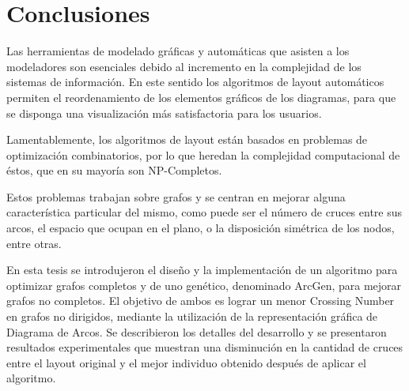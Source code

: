 \label{cap6}
\chapter{Conclusiones}
Las herramientas de modelado gráficas y automáticas que asisten a los modeladores son esenciales debido al incremento en la complejidad de los sistemas de información. En este sentido los algoritmos de layout automáticos permiten el reordenamiento de los elementos gráficos de los diagramas, para que se disponga una visualización más satisfactoria para los usuarios. 

Lamentablemente, los algoritmos de layout están basados en problemas de optimización combinatorios, por lo que heredan la complejidad computacional de éstos, que en su mayoría son NP-Completos.

Estos problemas trabajan sobre grafos y se centran en mejorar alguna característica particular del mismo, como puede ser el número de cruces entre sus arcos, el espacio que ocupan en el plano, o la disposición simétrica de los nodos, entre otras.


En esta tesis se introdujeron el diseño y la implementación de un algoritmo para optimizar grafos completos y de uno genético, denominado {\sc ArcGen}, para mejorar grafos no completos. El objetivo de ambos es lograr un menor Crossing Number en grafos no dirigidos, mediante la utilización de la representación gráfica de Diagrama de Arcos.
Se describieron los detalles del desarrollo y se presentaron resultados experimentales que muestran una disminución en la cantidad de cruces entre el layout original y el mejor individuo obtenido después de aplicar el algoritmo.



